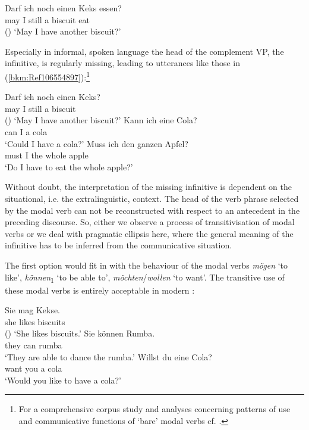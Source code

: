 \documentclass[output=paper
  ,nobabel
  ,draftmode
  ,colorlinks, citecolor=brown
]{langscibook}
\begin{document}
\ea
\label{bkm:Ref106554656}
\gll Darf  ich  noch  einen   Keks      essen? \\
     may  I      still    a          biscuit   eat\\\hfill()
\glt `May I have another biscuit?'
\z

\noindent
Especially in informal, spoken language the head of the complement VP, the infinitive, is
regularly missing, leading to utterances like those in (\ref{bkm:Ref106554897}):\footnote{For a
    comprehensive corpus study and analyses concerning patterns of use and communicative functions
    of `bare' modal verbs cf. \citet{Kaiser2017}.}

\eal
\label{bkm:Ref106554897}
\ex
\gll Darf  ich  noch  einen   Keks?\\
     may  I      still    a          biscuit \\\hfill()
\glt   `May I have another biscuit?'
\ex
\gll Kann  ich  eine   Cola?\\
       can     I      a       cola \\
\glt   `Could I have a cola?'
\ex
\gll Muss   ich   den    ganzen    Apfel?\\
       must    I      the     whole      apple \\
\glt   `Do I have to eat the whole apple?'
\zl

\noindent
Without doubt, the interpretation of the missing infinitive is dependent on the situational,
i.e. the extralinguistic, context. The head of the verb phrase selected by the modal verb can not be
reconstructed with respect to an antecedent in the preceding discourse. So, either we observe a
process of transitivisation of modal verbs or we deal with pragmatic ellipsis here, where the
general meaning of the infinitive has to be inferred from the communicative situation.

The first option would fit in with the behaviour of the modal verbs \emph{mögen} `to like',
\emph{können}\textsubscript{1} `to be able to', \emph{möchten}/\emph{wollen} `to want'. The
transitive use of these modal verbs is entirely acceptable in modern :

\eal
\label{bkm:Ref106556883}
\ex
\gll Sie  mag       Kekse.\\
       she  likes      biscuits \\\hfill()
\glt   `She likes biscuits.'
\ex
\gll Sie     können  Rumba.\\
       they   can        rumba \\
\glt   `They are able to dance the rumba.'
\ex
\gll Willst  du    eine   Cola?\\
       want    you  a        cola \\
\glt   `Would you like to have a cola?'
\zl
\end{document}
